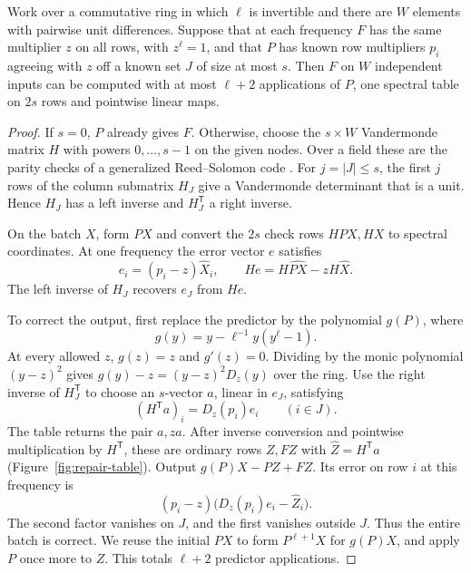 \begin{lemma}\label{lem:hermite-repair}
Work over a commutative ring in which \(\ell\) is invertible and there
are \(W\) elements with pairwise unit differences. Suppose that at each
frequency \(F\) has the same multiplier \(z\) on all rows, with
\(z^\ell=1\), and that \(P\) has known row multipliers \(p_i\) agreeing
with \(z\) off a known set \(J\) of size at most \(s\). Then \(F\) on
\(W\) independent inputs can be computed with at most \(\ell+2\)
applications of \(P\), one spectral table on \(2s\) rows and
pointwise linear maps.
\end{lemma}
\begin{proof}
If \(s=0\), \(P\) already gives \(F\). Otherwise, choose the \(s\times W\)
Vandermonde matrix \(H\) with powers \(0,\ldots,s-1\) on the given
nodes. Over a field these are the parity checks of a generalized
Reed--Solomon code \cite{reedsolomon}. For \(j=|J|\le s\), the first
\(j\) rows of the column submatrix \(H_J\) give a Vandermonde
determinant that is a unit. Hence \(H_J\) has a left inverse and
\(H_J^{\mathsf T}\) a right inverse.

On the batch \(X\), form \(PX\) and convert the \(2s\) check rows
\(HPX,HX\) to spectral coordinates. At one frequency the error vector
\(e\) satisfies
\[
 e_i=(p_i-z)\widehat X_i,\qquad
 He=H\widehat{PX}-zH\widehat X.
\]
The left inverse of \(H_J\) recovers \(e_J\) from \(He\).

To correct the output, first replace the predictor by the polynomial
\(g(P)\), where
\[
 g(y)=y-\ell^{-1}y(y^\ell-1).
\]
At every allowed \(z\), \(g(z)=z\) and \(g'(z)=0\). Dividing by the
monic polynomial \((y-z)^2\) gives
\(g(y)-z=(y-z)^2D_z(y)\) over the ring. Use the right inverse of
\(H_J^{\mathsf T}\) to choose an \(s\)-vector \(a\), linear in \(e_J\),
satisfying
\[
 (H^{\mathsf T}a)_i=D_z(p_i)e_i\qquad(i\in J).
\]
The table returns the pair \(a,za\). After inverse conversion and
pointwise multiplication by \(H^{\mathsf T}\), these are ordinary
rows \(Z,FZ\) with \(\widehat Z=H^{\mathsf T}a\)
(Figure~\ref{fig:repair-table}). Output \(g(P)X-PZ+FZ\).
Its error on row \(i\) at this frequency is
\[
 (p_i-z)\bigl(D_z(p_i)e_i-\widehat Z_i\bigr).
\]
The second factor vanishes on \(J\), and the first vanishes outside
\(J\). Thus the entire batch is correct. We reuse the initial \(PX\)
to form \(P^{\ell+1}X\) for \(g(P)X\), and apply \(P\) once more
to \(Z\). This totals \(\ell+2\) predictor applications.
\end{proof}

